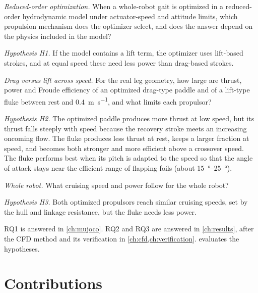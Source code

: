 \begin{description}[leftmargin=12mm,style=nextline]
\item[(RQ1)] \emph{Reduced-order optimization.} When a whole-robot gait is optimized in a reduced-order
  hydrodynamic model under actuator-speed and attitude limits, which propulsion mechanism does the optimizer
  select, and does the answer depend on the physics included in the model?

  \emph{Hypothesis H1.} If the model contains a lift term, the optimizer uses lift-based strokes, and at equal
  speed these need less power than drag-based strokes.

\item[(RQ2)] \emph{Drag versus lift across speed.} For the real leg geometry, how large are thrust, power and
  Froude efficiency of an optimized drag-type paddle and of a lift-type fluke between rest and
  \SI{0.4}{\metre\per\second}, and what limits each propulsor?

  \emph{Hypothesis H2.} The optimized paddle produces more thrust at low speed, but its thrust falls steeply
  with speed because the recovery stroke meets an increasing oncoming flow. The fluke produces less thrust at
  rest, keeps a larger fraction at speed, and becomes both stronger and more efficient above a crossover
  speed. The fluke performs best when its pitch is adapted to the speed so that the angle of attack stays
  near the efficient range of flapping foils (about \SIrange{15}{25}{\degree}).

\item[(RQ3)] \emph{Whole robot.} What cruising speed and power follow for the whole robot?

  \emph{Hypothesis H3.} Both optimized propulsors reach similar cruising speeds, set by the hull and linkage
  resistance, but the fluke needs less power.
\end{description}

RQ1 is answered in \cref{ch:mujoco}. RQ2 and RQ3 are answered in \cref{ch:results}, after the CFD method and
its verification in \cref{ch:cfd,ch:verification}.  evaluates the hypotheses.

\section{Contributions}

